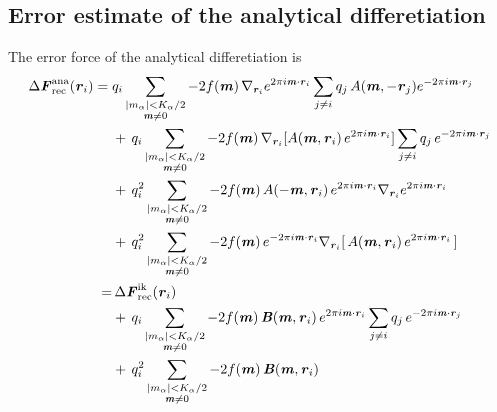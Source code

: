 \documentclass[aps,pre,preprint]{revtex4}
\renewcommand{\v}[1]{\textbf{\textit{#1}}}
\begin{document}
\subsection{Error estimate of the analytical differetiation}
\label{sec:error-ana}

The error force of the analytical differetiation is 
\begin{align}\nonumber
  \Delta\v F_{\textrm{rec}}^{\textrm{ana}}(\v r_i)
  =\;&
  q_i
  \sum_{
    \begin{subarray}{c}
      \vert m_{\alpha}\vert < K_\alpha/2\\
      \v m\neq 0
    \end{subarray}}
  -2f(\v m)\,
  \nabla_{\v r_i}
  e^{2\pi i\v m\cdot \v r_i}
  \sum_{j\neq i}q_j\,
  A(\v m, -\v r_j)
  e^{-2\pi i\v m\cdot\v r_j} \\\nonumber
  & +\,
  q_i
  \sum_{
    \begin{subarray}{c}
      \vert m_{\alpha}\vert < K_\alpha/2\\
      \v m\neq 0
    \end{subarray}}
  -2f(\v m)\,
  \nabla_{\v r_i}
  [A(\v m, \v r_i)\,
  e^{2\pi i\v m\cdot \v r_i} ]
  \sum_{j\neq i}q_j\,
  e^{-2\pi i\v m\cdot\v r_j} \\\nonumber
  & +\,
  q^2_i
  \sum_{
    \begin{subarray}{c}
      \vert m_{\alpha}\vert < K_\alpha/2\\\nonumber
      \v m\neq 0
    \end{subarray}}
  -2f(\v m)\,
  A(-\v m, \v r_i)\,e^{2\pi i\v m\cdot \v r_i} \nabla_{\v r_i}e^{2\pi i\v m\cdot\v r_i} \\\nonumber
  & +\,
  q^2_i
  \sum_{
    \begin{subarray}{c}
      \vert m_{\alpha}\vert < K_\alpha/2\\
      \v m\neq 0
    \end{subarray}}
  -2f(\v m)\,
  e^{-2\pi i\v m\cdot \v r_i}
  \nabla_{\v r_i} [\,A(\v m, \v r_i) \,e^{2\pi i\v m\cdot\v r_i}\,]  \\\nonumber
  =&\,
  \Delta\v F_{\textrm{rec}}^{\textrm{ik}}(\v r_i)\\\nonumber
  & +\,
  q_i
  \sum_{
    \begin{subarray}{c}
      \vert m_{\alpha}\vert < K_\alpha/2\\
      \v m\neq 0
    \end{subarray}}
  -2f(\v m)\,
  \v B(\v m, \v r_i)\,e^{2\pi i\v m\cdot \v r_i}
  \sum_{j\neq i}q_j\,
  e^{-2\pi i\v m\cdot\v r_j} \\\label{eqn:ana.error.force}
  & +\,
  q^2_i
  \sum_{
    \begin{subarray}{c}
      \vert m_{\alpha}\vert < K_\alpha/2\\
      \v m\neq 0
    \end{subarray}}
  -2f(\v m)\,\v B(\v m, \v r_i) 
\end{align}
\end{document}
